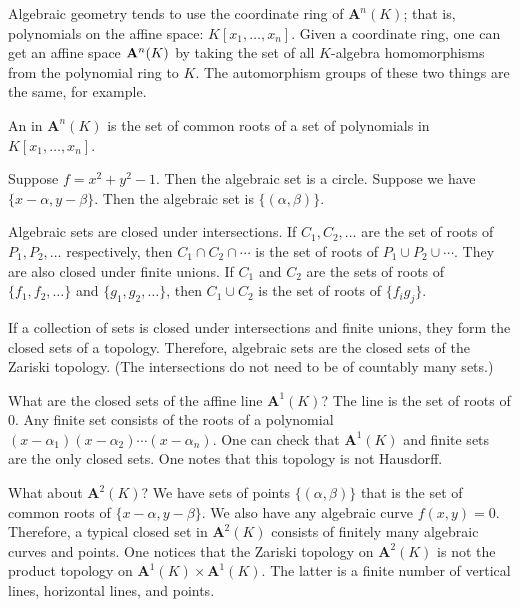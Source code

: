 \documentclass [11 pt, oneside, margin = 1 in] {article}
\begin{document}
Algebraic geometry tends to use the coordinate ring of $\mathbf{A}^n(K)$; that is, polynomials on the affine space: $K[x_1,\hdots, x_n]$. Given a coordinate ring, one can get an affine space $\mathbf{A}^n(K)$ by taking the set of all $K$-algebra homomorphisms from the polynomial ring to $K$. The automorphism groups of these two things are the same, for example.

\begin{definition}\label{}\text{}
An  in $\mathbf{A}^n(K)$ is the set of common roots of a set of polynomials in $K[x_1,\hdots, x_n]$.
\end{definition}

\begin{example}[ ]\label{}\text{}
Suppose $f=x^2+y^2-1$. Then the algebraic set is a circle. Suppose we have $\{x-\alpha,y-\beta\}$. Then the algebraic set is $\{(\alpha,\beta)\}$.
\end{example}

Algebraic sets are closed under intersections. If $C_1,C_2,\hdots $ are the set of roots of $P_1,P_2,\hdots$ respectively, then $C_1\cap C_2\cap \cdots $ is the set of roots of $P_1\cup P_2\cup \cdots$. They are also closed under finite unions. If $C_1$ and $C_2$ are the sets of roots of $\{f_1,f_2,\hdots\}$ and $\{g_1,g_2,\hdots\}$, then $C_1\cup C_2$ is the set of roots of $\{f_ig_j\}$.

If a collection of sets is closed under intersections and finite unions, they form the closed sets of a topology. Therefore, algebraic sets are the closed sets of the Zariski topology. (The intersections do not need to be of countably many sets.)

What are the closed sets of the affine line $\mathbf{A}^1(K)$? The line is the set of roots of $0$. Any finite set consists of the roots of a polynomial $(x-\alpha_1)(x-\alpha_2)\cdots(x-\alpha_n)$. One can check that $\mathbf{A}^1(K)$ and finite sets are the only closed sets. One notes that this topology is not Hausdorff.

What about $\mathbf{A}^2(K)$? We have sets of points $\{(\alpha,\beta)\}$ that is the set of common roots of $\{x-\alpha, y-\beta\}$. We also have any algebraic curve $f(x,y) =0$. Therefore, a typical closed set in $\mathbf{A}^2(K)$ consists of finitely many algebraic curves and points. One notices that the Zariski topology on $\mathbf{A}^2(K)$ is not the product topology on $\mathbf{A}^1(K)\times \mathbf{A}^1(K)$. The latter is a finite number of vertical lines, horizontal lines, and points.
\end{document}
